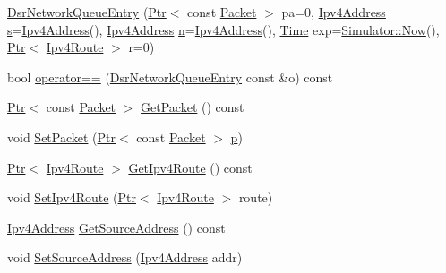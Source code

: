 \begin{DoxyCompactItemize}
\item 
\hyperlink{classns3_1_1dsr_1_1DsrNetworkQueueEntry_a09e658f115fd437ce5b67bb8f21ae9d8}{Dsr\+Network\+Queue\+Entry} (\hyperlink{classns3_1_1Ptr}{Ptr}$<$ const \hyperlink{classns3_1_1Packet}{Packet} $>$ pa=0, \hyperlink{classns3_1_1Ipv4Address}{Ipv4\+Address} \hyperlink{generate__test__data__lte__sinr_8m_ad83eeb3a142285d1243a08c6b7026df8}{s}=\hyperlink{classns3_1_1Ipv4Address}{Ipv4\+Address}(), \hyperlink{classns3_1_1Ipv4Address}{Ipv4\+Address} \hyperlink{lte__link__budget__x2__handover__measures_8m_abdb05bc5a064cf642a06c83b3392f148}{n}=\hyperlink{classns3_1_1Ipv4Address}{Ipv4\+Address}(), \hyperlink{classns3_1_1Time}{Time} exp=\hyperlink{classns3_1_1Simulator_ac3178fa975b419f7875e7105be122800}{Simulator\+::\+Now}(), \hyperlink{classns3_1_1Ptr}{Ptr}$<$ \hyperlink{classns3_1_1Ipv4Route}{Ipv4\+Route} $>$ r=0)
\item 
bool \hyperlink{classns3_1_1dsr_1_1DsrNetworkQueueEntry_ab2c1da8aafb0656364a868d5fd4689b9}{operator==} (\hyperlink{classns3_1_1dsr_1_1DsrNetworkQueueEntry}{Dsr\+Network\+Queue\+Entry} const \&o) const 
\item 
\hyperlink{classns3_1_1Ptr}{Ptr}$<$ const \hyperlink{classns3_1_1Packet}{Packet} $>$ \hyperlink{classns3_1_1dsr_1_1DsrNetworkQueueEntry_a1eec1cc61f8da3526d94d0d4202335eb}{Get\+Packet} () const 
\item 
void \hyperlink{classns3_1_1dsr_1_1DsrNetworkQueueEntry_ad7cc94e92eaa39f9f91f7ffb5c6d8e8f}{Set\+Packet} (\hyperlink{classns3_1_1Ptr}{Ptr}$<$ const \hyperlink{classns3_1_1Packet}{Packet} $>$ \hyperlink{lte__link__budget__x2__handover__measures_8m_ac9de518908a968428863f829398a4e62}{p})
\item 
\hyperlink{classns3_1_1Ptr}{Ptr}$<$ \hyperlink{classns3_1_1Ipv4Route}{Ipv4\+Route} $>$ \hyperlink{classns3_1_1dsr_1_1DsrNetworkQueueEntry_ad722089c3c4324534bc71d90db942946}{Get\+Ipv4\+Route} () const 
\item 
void \hyperlink{classns3_1_1dsr_1_1DsrNetworkQueueEntry_a5ac8531bbe6896f690467ce732150c74}{Set\+Ipv4\+Route} (\hyperlink{classns3_1_1Ptr}{Ptr}$<$ \hyperlink{classns3_1_1Ipv4Route}{Ipv4\+Route} $>$ route)
\item 
\hyperlink{classns3_1_1Ipv4Address}{Ipv4\+Address} \hyperlink{classns3_1_1dsr_1_1DsrNetworkQueueEntry_abe497de053d4f0320971703b73eacd91}{Get\+Source\+Address} () const 
\item 
void \hyperlink{classns3_1_1dsr_1_1DsrNetworkQueueEntry_aae4c920922f23ce151437f3b66f15317}{Set\+Source\+Address} (\hyperlink{classns3_1_1Ipv4Address}{Ipv4\+Address} addr)

\end{DoxyCompactItemize}
